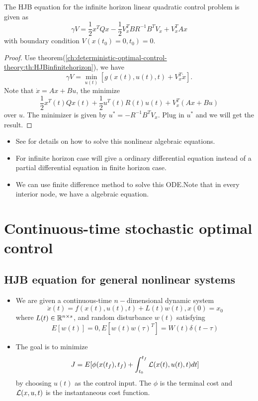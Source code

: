 \begin{refsection}
\begin{theorem}
The HJB equation for the infinite horizon linear quadratic control problem is given as
$$\gamma V = \frac{1}{2}x^TQx- \frac{1}{2}V^{T}_xBR^{-1}B^TV_x+V^{T}_xAx$$ with boundary condition $V(x(t_0) = 0 ,t_0) = 0$.  
\end{theorem}
\begin{proof}
	Use theorem(\autoref{ch:deterministic-optimal-control-theory:th:HJBinfinitehorizon}), we have
	$$\gamma V =\min_{u(t)}[ g(x(t),u(t),t) + V_x^T\dot{x}].$$
	Note that $\dot{x} = Ax + Bu$, the minimize 
	$$\frac{1}{2}x^T(t)Qx(t) + \frac{1}{2}u^T(t)R(t)u(t) + V_x^T(Ax+Bu)$$
	over $u$.
	The minimizer is given by $u^* = -R^{-1}B^TV_x$.
	Plug in $u^*$ and we will get the result.	
\end{proof}

\begin{remark}\hfill
	\begin{itemize}
		\item See \cite[213]{kirk2012optimal}\cite{wiki:algebraicRiccati} for details on how to solve this nonlinear algebraic equations.
		\item For infinite horizon case will give a ordinary differential equation instead of a partial differential equation in finite horizon case. 
		\item We can use finite difference method to solve this ODE.Note that in every interior node, we have a algebraic equation.
	\end{itemize}

\end{remark}

\section{Continuous-time stochastic optimal control}
\subsection{HJB equation for general nonlinear systems}
\begin{definition}\cite[421]{stengel2012optimal}\hfill
	\begin{itemize}
		\item We are given a continuous-time $n-$dimensional dynamic system
		$$\dot{x}(t)  =  f(x(t),u(t),t) + L(t)w(t),x(0) = x_0$$
		where $L(t)\in \mathbb{R}^{n\times s}$, and random disturbance $w(t)$ satisfying 
		$$E[w(t)] = 0, E[w(t)w(\tau)^T] = W(t)\delta(t-\tau)$$
		\item The goal is to minimize
		$$J = E[\phi(x(t_f),t_f) + \int_{t_0}^{t_f} \mathcal{L}(x(t),u(t),t) dt]$$
		by choosing $u(t)$ as the control input. The $\phi$ is the terminal cost and $\mathcal{L}(x,u,t)$ is the instantaneous cost function.
	\end{itemize}
\end{definition}


\end{refsection}
